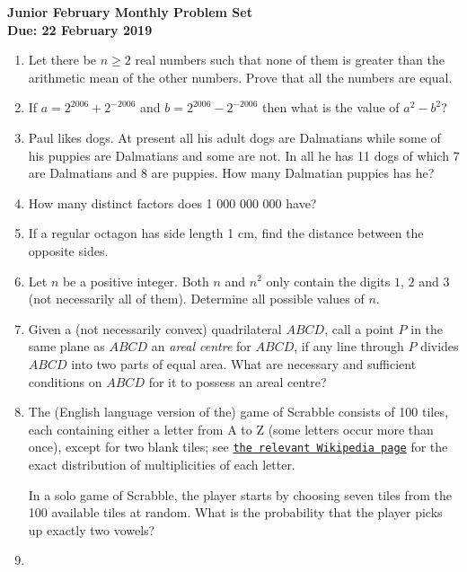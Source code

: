 \documentclass{article}
\begin{document}
\begin{center}
\textbf{\Large Junior February Monthly Problem Set}
\\ \vspace{1em}
\textbf{\large Due: 22 February 2019}
\end{center}

\vspace{12pt}

\begin{enumerate}[1.]

\item %

Let there be $n \geq 2$ real numbers such that none of them is greater than the arithmetic mean of the other numbers. Prove that all the numbers are equal.

\item %
If $a = 2^{2006} + 2^{-2006}$ and $b = 2^{2006} - 2^{-2006}$ then what is the value of $a^2 - b^2$?


\item %
Paul likes dogs. At present all his adult dogs are Dalmatians while some of his puppies are Dalmatians and some are not. In all he has 11 dogs of which 7 are Dalmatians and 8 are puppies. How many Dalmatian puppies has he?


\item %
How many distinct factors does 1 000 000 000 have?


\item %
If a regular octagon has side length 1 cm, find the distance between the opposite sides.


\item %
Let $n$ be a positive integer. Both $n$ and $n^2$ only contain the digits $1$, $2$ and $3$ (not necessarily all of them). Determine all possible values of $n$.


\item %
Given a (not necessarily convex) quadrilateral $ABCD$, call a point $P$ in the same plane as $ABCD$ an \emph{areal centre} for $ABCD$, if any line through $P$ divides $ABCD$ into two parts of equal area. What are necessary and sufficient conditions on $ABCD$ for it to possess an areal centre?


\item %
The (English language version of the) game of Scrabble\texttrademark{} consists of 100 tiles, each containing either a letter from A to Z (some letters occur more than once), except for two blank tiles; see \href{https://en.wikipedia.org/wiki/Scrabble_letter_distributions#English}{\texttt{the relevant Wikipedia page}} for the exact distribution of multiplicities of each letter.

In a solo game of Scrabble, the player starts by choosing seven tiles from the 100 available tiles at random. What is the probability that the player picks up exactly two vowels?


\item %


\end{enumerate}
\end{document}
